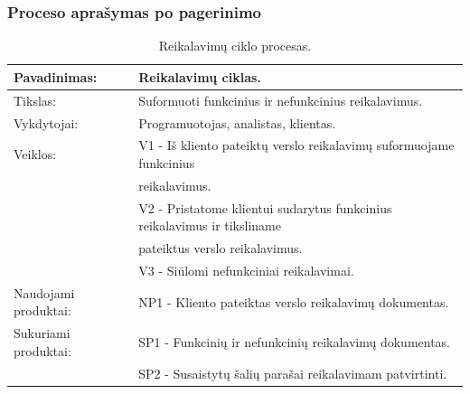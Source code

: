 \documentclass{VUMIFPSkursinis}
\begin{document}
\subsubsection{Proceso aprašymas po pagerinimo}
\begin{center}
	\begin{table}[ht]
		\caption{Reikalavimų ciklo procesas.}
		\begin{tabular}{ | l | l | }
			\hline
			Pavadinimas:		& Reikalavimų ciklas.												\\ \hline
			Tikslas:		& Suformuoti funkcinius ir nefunkcinius reikalavimus.								\\ \hline
			Vykdytojai:		& Programuotojas, analistas, klientas.										\\ \hline
			Veiklos:		& V1 - Iš kliento pateiktų verslo reikalavimų suformuojame funkcinius \\ & reikalavimus. 			\\

						& V2 - Pristatome klientui sudarytus funkcinius reikalavimus ir tiksliname \\& pateiktus verslo reikalavimus.	\\
						& V3 - Siūlomi nefunkciniai reikalavimai.									\\ \hline
			Naudojami produktai:	& NP1 - Kliento pateiktas verslo reikalavimų dokumentas.							\\ \hline
			Sukuriami produktai:	& SP1 - Funkcinių ir nefunkcinių reikalavimų dokumentas.							\\ \hline
						& SP2 - Susaistytų šalių parašai reikalavimam patvirtinti.							\\ \hline
		\end{tabular}
	\end{table}
\end{center}
\end{document}
